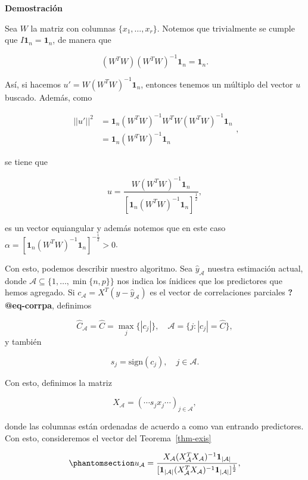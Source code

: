 \documentclass[
  letterpaper,
  DIV=11,
  numbers=noendperiod]{scrreprt}
\theoremstyle{definition}
\theoremstyle{plain}
\theoremstyle{remark}
\begin{document}
\begin{tcolorbox}[enhanced jigsaw, colback=white, toprule=.15mm, opacityback=0, arc=.35mm, rightrule=.15mm, breakable, leftrule=.75mm, bottomrule=.15mm, left=2mm, colframe=quarto-callout-important-color-frame]

\vspace{-3mm}\textbf{Demostración}\vspace{3mm}

Sea \(W\) la matriz con columnas \(\{x_1,\dots, x_r\}\). Notemos que
trivialmente se cumple que \(I\mathbf 1_n=\mathbf 1_n\), de manera que

\[ (W^TW)(W^TW)^{-1}\mathbf 1_n=\mathbf 1_n. \]

Así, si hacemos \(u'=W(W^TW)^{-1}\mathbf 1_n\), entonces tenemos un
múltiplo del vector \(u\) buscado. Además, como

\[ \begin{aligned} ||u'||^2&=\mathbf 1_n(W^TW)^{-1} W^TW(W^TW)^{-1}\mathbf 1_n\\ &=\mathbf 1_n(W^TW)^{-1}\mathbf 1_n \end{aligned}, \]

se tiene que

\[ u=\frac{W(W^TW)^{-1}\mathbf 1_n}{[\mathbf 1_n (W^TW)^{-1}\mathbf 1_n]^{\frac 12}}, 
\]

es un vector equiangular y además notemos que en este caso
\(\alpha=[\mathbf 1_n(W^TW)^{-1}\mathbf 1_n]^{-\frac 12}>0\).

\end{tcolorbox}

Con esto, podemos describir nuestro algoritmo. Sea
\(\hat y_{\mathcal A}\) nuestra estimación actual, donde
\(\mathcal A\subseteq \{1,\dots, \min\{n,p\}\}\) nos indica los ínidices
que los predictores que hemos agregado. Si
\(c_{\mathcal A}=X^T(y-\hat y_{\mathcal{A}})\) es el vector de
correlaciones parciales \textbf{?@eq-corrpa}, definimos

\[
\hat C_\mathcal A=\hat C=\max_j\{|c_j|\},\quad \mathcal A=\{j:|c_j|=\hat C\},
\]y también

\[
s_j=\text{sign}(c_j),\quad j\in \mathcal A.
\]

Con esto, definimos la matriz

\[ X_{\mathcal A}=(\cdots s_jx_j\cdots)_{j\in \mathcal A}, \]

donde las columnas están ordenadas de acuerdo a como van entrando
predictores. Con esto, consideremos el vector del Teorema~\ref{thm-exis}

\begin{equation}\phantomsection\label{eq-ua}{ u_\mathcal A =\frac{X_\mathcal A(X^T_{\mathcal A} X_{\mathcal A})^{-1}\mathbf 1_{|\mathcal A|}}{[\mathbf 1_{|\mathcal A|}(X_{\mathcal A}^TX_{\mathcal A})^{-1}\mathbf 1_{|\mathcal A|}]^{\frac 12}}, }\end{equation}
\end{document}
